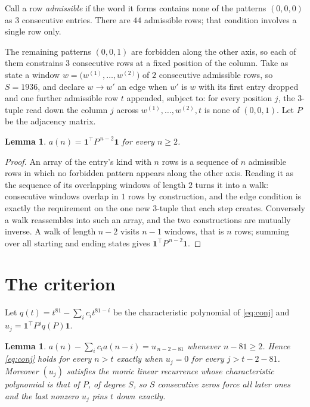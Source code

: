 \documentclass[11pt,a4paper]{article}
\theoremstyle{plain}
\newtheorem{lemma}[theorem]{Lemma}
\theoremstyle{definition}
\begin{document}
Call a row \emph{admissible} if the word it forms contains none of the patterns
$(0,0,0)$ as $3$ consecutive entries. There are $44$ admissible rows; that condition
involves a single row only.

The remaining patterns $(0,0,1)$ are forbidden along the other axis, so each of them
constrains $3$ consecutive rows at a fixed position of the column. Take as state a
window $w=\bigl(w^{(1)},\dots,w^{(2)}\bigr)$ of $2$ consecutive admissible
rows, so $S=1936$, and declare $w\to w'$ an edge when $w'$ is $w$ with its first entry
dropped and one further admissible row $t$ appended, subject to: for every position
$j$, the $3$-tuple read down the column $j$ across $w^{(1)},\dots,w^{(2)},t$
is none of $(0,0,1)$. Let $P$ be the adjacency matrix.

\begin{lemma}\label{lem:walk}
$a(n)=\mathbf{1}^{\!\top}P^{\,n-2}\mathbf{1}$ for every $n\ge2$.
\end{lemma}

\begin{proof}
An array of the entry's kind with $n$ rows is a sequence of $n$ admissible rows in
which no forbidden pattern appears along the other axis. Reading it as the sequence of its
overlapping windows of length $2$ turns it into a walk: consecutive windows overlap in
$1$ rows by construction, and the edge condition is exactly the requirement on the one
new $3$-tuple that each step creates. Conversely a walk reassembles into such an array,
and the two constructions are mutually inverse. A walk of length $n-2$ visits $n-1$
windows, that is $n$ rows; summing over all starting and ending states gives
$\mathbf{1}^{\!\top}P^{\,n-2}\mathbf{1}$.
\end{proof}

\section{The criterion}

Let $q(t)=t^{81}-\sum_i c_i t^{81-i}$ be the characteristic polynomial of
\eqref{eq:conj} and $u_j=\mathbf{1}^{\!\top}P^{j}q(P)\mathbf{1}$.

\begin{lemma}\label{lem:crit}
$a(n)-\sum_i c_i a(n-i)=u_{\,n-2-81}$ whenever $n-81\ge2$. Hence
\eqref{eq:conj} holds for every $n>t$ exactly when $u_j=0$ for every
$j>t-2-81$. Moreover $(u_j)$ satisfies the monic linear recurrence whose
characteristic polynomial is that of $P$, of degree $S$, so $S$ consecutive zeros force all
later ones and the last nonzero $u_j$ pins $t$ down exactly.
\end{lemma}
\end{document}
